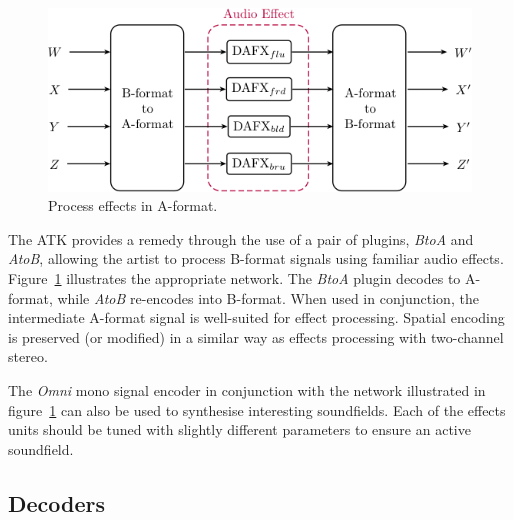 \documentclass{article}
\begin{document}
\begin{figure}[h]
\captionsetup{aboveskip=-6pt}
\centering
\includegraphics[width=1.0\columnwidth]{figures/DAFXNetwork.png}
\setlength{\abovecaptionskip}{0pt plus 3pt minus 2pt} %
\caption{Process effects in A-format.\label{fig:aToB}}
\end{figure}

The ATK provides a remedy through the use of a pair of plugins, \emph{BtoA} and \emph{AtoB}, allowing the artist to process B-format signals using familiar audio effects.
Figure~\ref{fig:aToB} illustrates the appropriate network. The \emph{BtoA} plugin decodes to A-format, while \emph{AtoB} re-encodes into B-format.
When used in conjunction, the intermediate A-format signal is well-suited for effect processing. Spatial encoding is preserved (or modified) in a similar way as effects processing with two-channel stereo.

The \emph{Omni} mono signal encoder in conjunction with the network illustrated in figure~\ref{fig:aToB} can also be used to synth\-esise interesting soundfields.
Each of the effects units should be tuned with slightly different parameters to ensure an active soundfield.





\subsection{Decoders}\label{sec:decoders}
\end{document}
